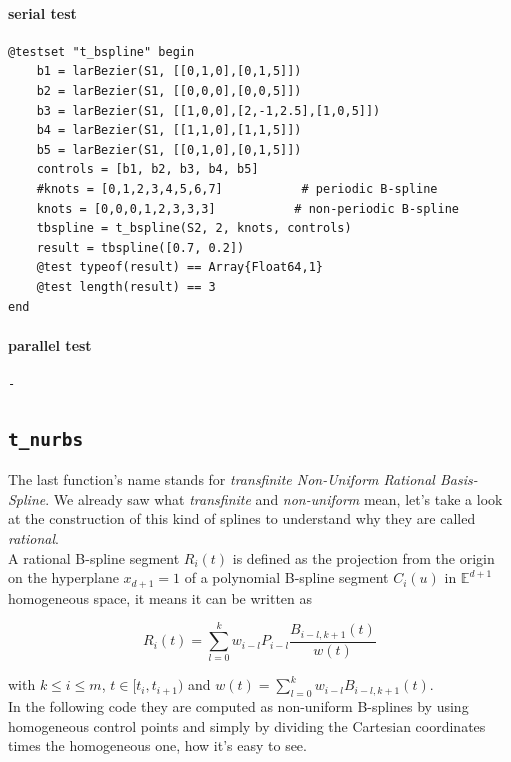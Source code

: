 \documentclass[a4paper,11pt]{article}
\begin{document}
\paragraph{serial test}
\begin{verbatim}
@testset "t_bspline" begin
    b1 = larBezier(S1, [[0,1,0],[0,1,5]])
    b2 = larBezier(S1, [[0,0,0],[0,0,5]])
    b3 = larBezier(S1, [[1,0,0],[2,-1,2.5],[1,0,5]])
    b4 = larBezier(S1, [[1,1,0],[1,1,5]])
    b5 = larBezier(S1, [[0,1,0],[0,1,5]])
    controls = [b1, b2, b3, b4, b5]
    #knots = [0,1,2,3,4,5,6,7]           # periodic B-spline
    knots = [0,0,0,1,2,3,3,3]           # non-periodic B-spline
    tbspline = t_bspline(S2, 2, knots, controls) 
    result = tbspline([0.7, 0.2])
    @test typeof(result) == Array{Float64,1}
    @test length(result) == 3
end
\end{verbatim}

\paragraph{parallel test}
\begin{verbatim}
-
\end{verbatim}


\subsection{\texttt{t\_nurbs}}

The last function's name stands for \emph{transfinite Non-Uniform Rational Basis-Spline}. We already saw what \emph{transfinite} and \emph{non-uniform} mean, let's take a look at the construction of this kind of splines to understand why they are called \emph{rational}. \\
A rational B-spline segment $R_i(t)$ is defined as the projection from the origin on the hyperplane $x_{d+1}=1$ of a polynomial B-spline segment $C_i(u)$ in $\mathds{E}^{d+1}$ homogeneous space, it means it can be written as

\begin{equation*}
R_i(t)=\sum_{l=0}^k w_{i-l} P_{i-l} \frac{B_{i-l,k+1}(t)}{w(t)}
\end{equation*}

with $k \leq i \leq m$, $t \in [t_i, t_{i+1})$ and $w(t)=\sum_{l=0}^k w_{i-l}B_{i-l,k+1}(t)$. \\
In the following code they are computed as non-uniform B-splines by using homogeneous control points and simply by dividing the Cartesian coordinates times the homogeneous one, how it's easy to see.
\end{document}
